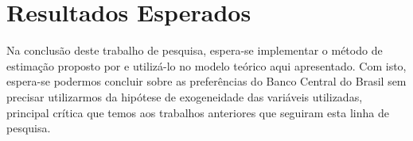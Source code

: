 \documentclass[
	article,			%
	11pt,				%
	oneside,			%
	a4paper,			%
	english,			%
	brazil,				%
	]{abntex2}
\begin{document}
{	
	\section{Resultados Esperados}
	
	Na conclusão deste trabalho de pesquisa, espera-se implementar o método de estimação proposto por  e utilizá-lo no modelo teórico aqui apresentado. Com isto, espera-se podermos concluir sobre as preferências do Banco Central do Brasil sem precisar utilizarmos da hipótese de exogeneidade das variáveis utilizadas, principal crítica que temos aos trabalhos anteriores que seguiram esta linha de pesquisa.

	\newpage



	

	
	
	
	
	
	
	
	
}
\end{document}
